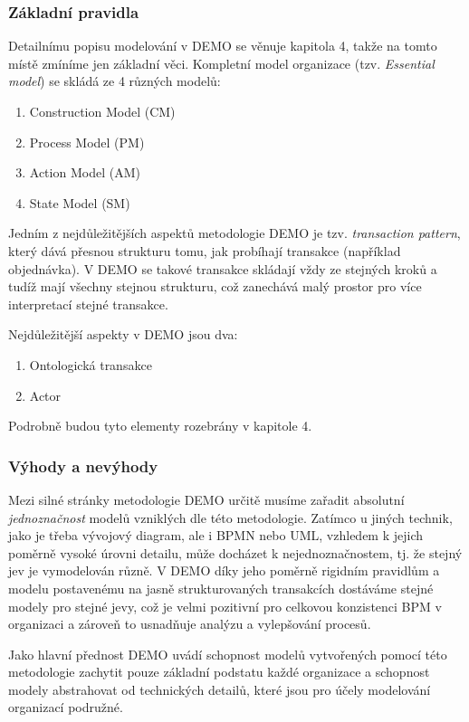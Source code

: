 \subsubsection{Základní pravidla}
Detailnímu popisu modelování v DEMO se věnuje kapitola 4, takže na tomto místě zmíníme jen základní věci. Kompletní model organizace (tzv. \textit{Essential model}) se skládá ze 4 různých modelů: \cite{Vejrazkova2012}

\begin{enumerate}
\item Construction Model (CM)
\item Process Model (PM)
\item Action Model (AM)
\item State Model (SM)
\end{enumerate}

Jedním z nejdůležitějších aspektů metodologie DEMO je tzv. \textit{transaction pattern}, který dává přesnou strukturu tomu, jak probíhají transakce (například objednávka). V DEMO se takové transakce skládají vždy ze stejných kroků a tudíž mají všechny stejnou strukturu, což zanechává malý prostor pro více interpretací stejné transakce.

Nejdůležitější aspekty v DEMO jsou dva:

\begin{enumerate}
\item Ontologická transakce
\item Actor
\end{enumerate}

Podrobně budou tyto elementy rozebrány v kapitole 4. %

\subsubsection{Výhody a nevýhody}
Mezi silné stránky metodologie DEMO určitě musíme zařadit absolutní \textit{jednoznačnost} modelů vzniklých dle této metodologie. Zatímco u jiných technik, jako je třeba vývojový diagram, ale i BPMN nebo UML, vzhledem k jejich poměrně vysoké úrovni detailu, může docházet k nejednoznačnostem, tj. že stejný jev je vymodelován různě. V DEMO díky jeho poměrně rigidním pravidlům a modelu postavenému na jasně strukturovaných transakcích dostáváme stejné modely pro stejné jevy, což je velmi pozitivní pro celkovou konzistenci BPM v organizaci a zároveň to usnadňuje analýzu a vylepšování procesů.

Jako hlavní přednost DEMO uvádí \cite{Barjis2011} schopnost modelů vytvořených pomocí této metodologie zachytit pouze základní podstatu každé organizace a schopnost modely abstrahovat od technických detailů, které jsou pro účely modelování organizací podružné.

